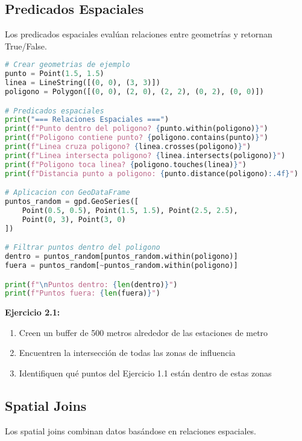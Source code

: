 \documentclass[11pt,a4paper]{article}
\newcommand{\ejercicio}[1]{\begin{tcolorbox}[colback=red!5,colframe=red,title={Ejercicio}]#1\end{tcolorbox}}
\begin{document}
\subsection{Predicados Espaciales}

Los predicados espaciales evalúan relaciones entre geometrías y retornan True/False.

\begin{lstlisting}[language=Python]
# Crear geometrias de ejemplo
punto = Point(1.5, 1.5)
linea = LineString([(0, 0), (3, 3)])
poligono = Polygon([(0, 0), (2, 0), (2, 2), (0, 2), (0, 0)])

# Predicados espaciales
print("=== Relaciones Espaciales ===")
print(f"Punto dentro del poligono? {punto.within(poligono)}")
print(f"Poligono contiene punto? {poligono.contains(punto)}")
print(f"Linea cruza poligono? {linea.crosses(poligono)}")
print(f"Linea intersecta poligono? {linea.intersects(poligono)}")
print(f"Poligono toca linea? {poligono.touches(linea)}")
print(f"Distancia punto a poligono: {punto.distance(poligono):.4f}")

# Aplicacion con GeoDataFrame
puntos_random = gpd.GeoSeries([
    Point(0.5, 0.5), Point(1.5, 1.5), Point(2.5, 2.5),
    Point(0, 3), Point(3, 0)
])

# Filtrar puntos dentro del poligono
dentro = puntos_random[puntos_random.within(poligono)]
fuera = puntos_random[~puntos_random.within(poligono)]

print(f"\nPuntos dentro: {len(dentro)}")
print(f"Puntos fuera: {len(fuera)}")
\end{lstlisting}

\ejercicio{
\textbf{Ejercicio 2.1:} 
\begin{enumerate}
    \item Creen un buffer de 500 metros alrededor de las estaciones de metro
    \item Encuentren la intersección de todas las zonas de influencia
    \item Identifiquen qué puntos del Ejercicio 1.1 están dentro de estas zonas
\end{enumerate}
}

\subsection{Spatial Joins}

Los spatial joins combinan datos basándose en relaciones espaciales.
\end{document}
